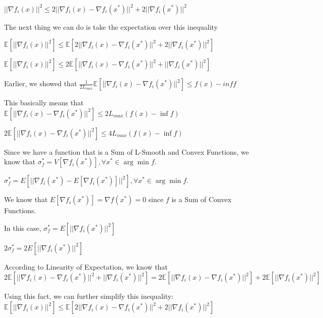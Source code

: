 $||\nabla f_i(x)||^2 \leq 2||\nabla f_i(x) - \nabla f_i(x^*)||^2 + 2||\nabla f_i(x^*)||^2$ \newline 

The next thing we can do is take the expectation over this inequality \newline

\noindent $\mathbb{E}[||\nabla f_i(x)||^2] \leq \mathbb{E} [2||\nabla f_i(x) - \nabla f_i(x^*)||^2 + 2||\nabla f_i(x^*)||^2]$ \newline 

$\mathbb{E}[||\nabla f_i(x)||^2] \leq 2\mathbb{E} [||\nabla f_i(x) - \nabla f_i(x^*)||^2 + ||\nabla f_i(x^*)||^2]$ \newline 

Earlier, we showed that $\frac{1}{2L_{max}} \mathbb{E}[||\nabla f_i(x) - \nabla f_i(x^*)||^2] \leq f(x) - inf f$ \newline 

This basically means that $\mathbb{E}[||\nabla f_i(x) - \nabla f_i(x^*)||^2] \leq 2L_{max} (f(x) - \inf f)$ \newline 

$2\mathbb{E}[||\nabla f_i(x) - \nabla f_i(x^*)||^2] \leq 4L_{max} (f(x) - \inf f)$

Since we have a function that is a Sum of L-Smooth and Convex Functions, we know that \newline 
\noindent $\sigma_f^* = V[\nabla f_i(x^*)], \forall x^* \in \arg \min f.$ \newline 

\noindent $\sigma_f^* = E[||\nabla f_i(x^*) - E[\nabla f_i(x^*)]||^2], \forall x^* \in \arg \min f.$ \newline 

We know that $E[\nabla f_i(x^*)] = \nabla f(x^*) = 0$ since $f$ is a Sum of Convex Functions. \newline 

In this case, 
\noindent $\sigma_f^* = E[||\nabla f_i(x^*)||^2]$ \newline 

$2 \sigma_f^* = 2 E[||\nabla f_i(x^*)||^2]$ \newline 

According to Linearity of Expectation, we know that \newline 
$2\mathbb{E} [||\nabla f_i(x) - \nabla f_i(x^*)||^2 + ||\nabla f_i(x^*)||^2] = 2\mathbb{E} [||\nabla f_i(x) - \nabla f_i(x^*)||^2] + 2 \mathbb{E}  [||\nabla f_i(x^*)||^2]$


Using this fact, we can further simplify this inequality: \noindent $\mathbb{E}[||\nabla f_i(x)||^2] \leq \mathbb{E} [2||\nabla f_i(x) - \nabla f_i(x^*)||^2 + 2||\nabla f_i(x^*)||^2]$ \newline 


